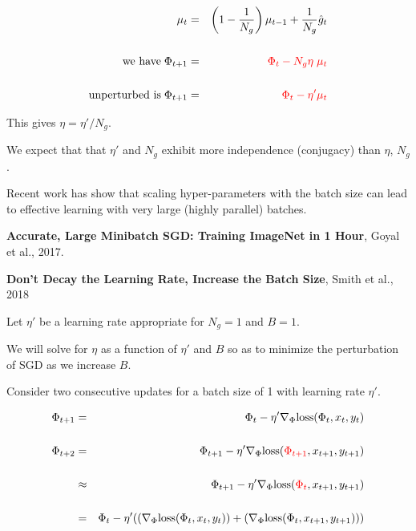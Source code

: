 {

\begin{eqnarray*}
\mu_t & = &  \left(1-\frac{1}{N_g}\right)\mu_{t-1} + \frac{1}{N_g} \hat{g}_t \\
\\
\mbox{we have}\;\Phi_{t+1}& = & {\color{red} \Phi_t - N_g\eta\;\mu_t} \\
\\
\mbox{unperturbed is}\;\Phi_{t+1}& = & {\color{red} \Phi_t - \eta'\mu_t}
\end{eqnarray*}

\vfill
This gives {\color{red} $\eta = \eta'/N_g$}.

\vfill
We expect that that $\eta'$ and $N_g$ exhibit more independence (conjugacy) than $\eta$, $N_g$.


Recent work has show that scaling hyper-parameters with the batch size can lead to effective learning with very large (highly parallel)
batches.

\vfill
{\bf Accurate, Large Minibatch SGD: Training ImageNet in 1 Hour}, Goyal et al., 2017.

\vfill
{\bf Don't Decay the Learning Rate, Increase the Batch Size}, Smith et al., 2018



Let $\eta'$ be a learning rate appropriate for $N_g = 1$ and $B = 1$.

\vfill
We will solve for $\eta$ as a function of $\eta'$ and $B$ so as to minimize the perturbation of SGD as we increase $B$.


Consider two consecutive updates for a batch size of 1 with learning rate $\eta'$.

\begin{eqnarray*}
  \Phi_{t+1} & = & \Phi_t - \eta' \nabla_\Phi \mathrm{loss}(\Phi_t,x_t,y_t) \\
  \\
  \Phi_{t+2} & = & \Phi_{t+1} - \eta' \nabla_\Phi \mathrm{loss}({\color{red} \Phi_{t+1}},x_{t+1},y_{t+1}) \\\
  \\
  & \approx & \Phi_{t+1} - \eta' \nabla_\Phi \mathrm{loss}({\color{red} \Phi_t},x_{t+1},y_{t+1}) \\
  \\
  & = & \Phi_t - \eta'((\nabla_\Phi \mathrm{loss}(\Phi_t,x_t,y_t)) + (\nabla_\Phi \mathrm{loss}(\Phi_t,x_{t+1},y_{t+1})))
\end{eqnarray*}

}
